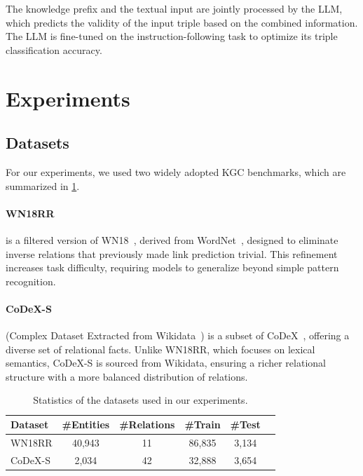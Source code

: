 \documentclass[12pt,a4paper]{article}
\begin{document}
The knowledge prefix and the textual input are jointly processed by the LLM,
which predicts the validity of the input triple based on the combined information.
The LLM is fine-tuned on the instruction-following task to optimize its triple classification accuracy.
%
%


\section{Experiments}\label{sec:experiments}

\subsection{Datasets}

For our experiments, we used two widely adopted KGC benchmarks, which are summarized in \cref{tab:datasets}.

\paragraph{WN18RR} is a filtered version of WN18~\cite{wn18rr}, derived from WordNet~\cite{wordnet}, designed to eliminate inverse relations that previously made link prediction trivial.
This refinement increases task difficulty, requiring models to generalize beyond simple pattern recognition.

\paragraph{CoDeX-S} (Complex Dataset Extracted from Wikidata~\cite{wikidata}) is a subset of CoDeX~\cite{safavi2020codex}, offering a diverse set of relational facts.
Unlike WN18RR, which focuses on lexical semantics, CoDeX-S is sourced from Wikidata, ensuring a richer relational structure with a more balanced distribution of relations.

\begin{table}
    \centering
    \begin{tabular}{l c c c c c}
        \hline
        Dataset & \#Entities & \#Relations & \#Train & \#Test \\
        \hline
        WN18RR  & 40,943     & 11          & 86,835  & 3,134  \\
        CoDeX-S & 2,034      & 42          & 32,888  & 3,654  \\
        \hline
    \end{tabular}
    \caption{Statistics of the datasets used in our experiments.}
    \label{tab:datasets}
\end{table}
\end{document}
